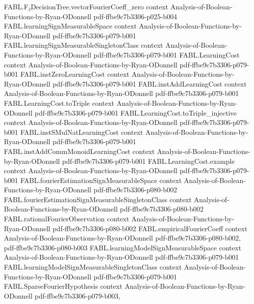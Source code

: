 \begin{theorem}
\proofstep
  {FABL.F₂DecisionTree.vectorFourierCoeff_zero}
  {context}
  {Analysis-of-Boolean-Functions-by-Ryan-ODonnell}
  {pdf-ffbe9c7b3306-p025-b004}
\proofstep
  {FABL.learningSignMeasurableSpace}
  {context}
  {Analysis-of-Boolean-Functions-by-Ryan-ODonnell}
  {pdf-ffbe9c7b3306-p079-b001}
\proofstep
  {FABL.learningSignMeasurableSingletonClass}
  {context}
  {Analysis-of-Boolean-Functions-by-Ryan-ODonnell}
  {pdf-ffbe9c7b3306-p079-b001}
\proofstep
  {FABL.LearningCost}
  {context}
  {Analysis-of-Boolean-Functions-by-Ryan-ODonnell}
  {pdf-ffbe9c7b3306-p079-b001}
\proofstep
  {FABL.instZeroLearningCost}
  {context}
  {Analysis-of-Boolean-Functions-by-Ryan-ODonnell}
  {pdf-ffbe9c7b3306-p079-b001}
\proofstep
  {FABL.instAddLearningCost}
  {context}
  {Analysis-of-Boolean-Functions-by-Ryan-ODonnell}
  {pdf-ffbe9c7b3306-p079-b001}
\proofstep
  {FABL.LearningCost.toTriple}
  {context}
  {Analysis-of-Boolean-Functions-by-Ryan-ODonnell}
  {pdf-ffbe9c7b3306-p079-b001}
\proofstep
  {FABL.LearningCost.toTriple_injective}
  {context}
  {Analysis-of-Boolean-Functions-by-Ryan-ODonnell}
  {pdf-ffbe9c7b3306-p079-b001}
\proofstep
  {FABL.instSMulNatLearningCost}
  {context}
  {Analysis-of-Boolean-Functions-by-Ryan-ODonnell}
  {pdf-ffbe9c7b3306-p079-b001}
\proofstep
  {FABL.instAddCommMonoidLearningCost}
  {context}
  {Analysis-of-Boolean-Functions-by-Ryan-ODonnell}
  {pdf-ffbe9c7b3306-p079-b001}
\proofstep
  {FABL.LearningCost.example}
  {context}
  {Analysis-of-Boolean-Functions-by-Ryan-ODonnell}
  {pdf-ffbe9c7b3306-p079-b001}
\proofstep
  {FABL.fourierEstimationSignMeasurableSpace}
  {context}
  {Analysis-of-Boolean-Functions-by-Ryan-ODonnell}
  {pdf-ffbe9c7b3306-p080-b002}
\proofstep
  {FABL.fourierEstimationSignMeasurableSingletonClass}
  {context}
  {Analysis-of-Boolean-Functions-by-Ryan-ODonnell}
  {pdf-ffbe9c7b3306-p080-b002}
\proofstep
  {FABL.rationalFourierObservation}
  {context}
  {Analysis-of-Boolean-Functions-by-Ryan-ODonnell}
  {pdf-ffbe9c7b3306-p080-b002}
\proofstep
  {FABL.empiricalFourierCoeff}
  {context}
  {Analysis-of-Boolean-Functions-by-Ryan-ODonnell}
  {pdf-ffbe9c7b3306-p080-b002,
    pdf-ffbe9c7b3306-p080-b003}
\proofstep
  {FABL.learningModelSignMeasurableSpace}
  {context}
  {Analysis-of-Boolean-Functions-by-Ryan-ODonnell}
  {pdf-ffbe9c7b3306-p079-b001}
\proofstep
  {FABL.learningModelSignMeasurableSingletonClass}
  {context}
  {Analysis-of-Boolean-Functions-by-Ryan-ODonnell}
  {pdf-ffbe9c7b3306-p079-b001}
\proofstep
  {FABL.SparseFourierHypothesis}
  {context}
  {Analysis-of-Boolean-Functions-by-Ryan-ODonnell}
  {pdf-ffbe9c7b3306-p079-b003,
}
\end{theorem}
